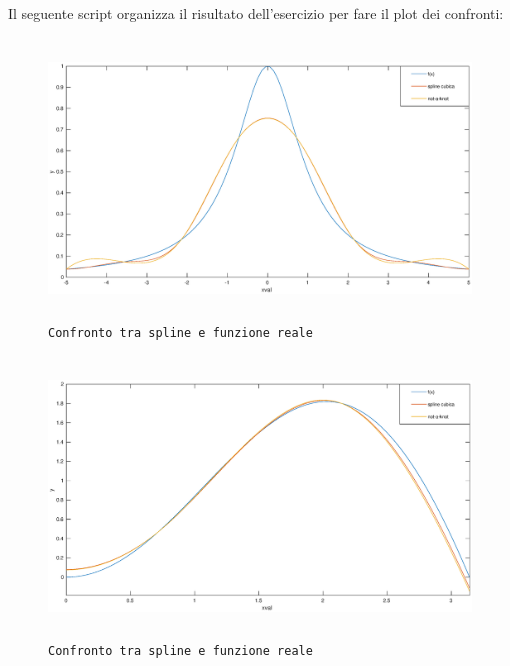\begin{flushleft}
Il seguente script organizza il risultato dell'esercizio per fare il plot dei confronti:

\begin{figure}[H]
\includegraphics[width=480px, height=280px]{plot/fes45b.eps}
\caption{\texttt{Confronto tra spline e funzione reale}}
\end{figure}
\begin{figure}[H]
\includegraphics[width=480px, height=280px]{plot/fes45a.eps}
\caption{\texttt{Confronto tra spline e funzione reale}}
\end{figure}
\end{flushleft}